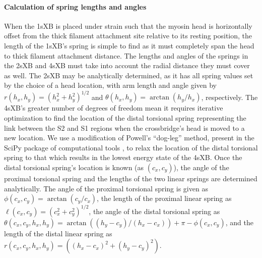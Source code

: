 \documentclass[]{article}
\begin{document}
\paragraph{Calculation of spring lengths and angles} %
When the 1sXB is placed under strain such that the myosin head is horizontally offset from the thick filament attachment site relative to its resting position, the length of the 1sXB's spring is simple to find as it must completely span the head to thick filament attachment distance.
The lengths and angles of the springs in the 2sXB and 4sXB must take into account the radial distance they must cover as well.
The 2sXB may be analytically determined, as it has all spring values set by the choice of a head location, with arm length and angle given by $r(h_x, h_y)=(h_x^2 + h_y^2)^{1/2}$ and $\theta(h_x, h_y)=\arctan(h_y/h_x)$, respectively.
The 4sXB's greater number of degrees of freedom mean it requires iterative optimization to find the location of the distal torsional spring representing the link between the S2 and S1 regions when the crossbridge's head is moved to a new location.
We use a modification of Powell's ``dog-leg'' method, present in the SciPy package of computational tools \citep{SciPy}, to relax the location of the distal torsional spring to that which results in the lowest energy state of the 4sXB.
Once the distal torsional spring's location is known (as $(c_x, c_y)$), the angle of the proximal torsional spring and the lengths of the two linear springs are determined analytically.
The angle of the proximal torsional spring is given as $\phi(c_x, c_y)=\arctan(c_y/c_x)$, the length of the proximal linear spring as $\ell(c_x, c_y)=(c_x^2 + c_y^2)^{1/2}$, the angle of the distal torsional spring as $\theta(c_x, c_y, h_x, h_y) = \arctan((h_y-c_y)/(h_x-c_x)) + \pi - \phi(c_x, c_y)$, and the length of the distal linear spring as $r(c_x, c_y, h_x, h_y)=((h_x-c_x)^2 + (h_y-c_y)^2)$.
\end{document}
